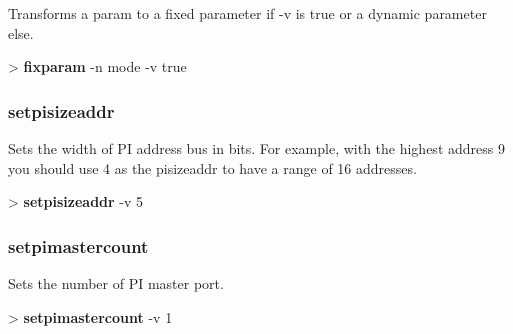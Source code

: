 \documentclass[10pt,a4paper]{article}
\begin{document}
Transforms a param to a fixed parameter  if -v is true or a dynamic parameter else.

\begin{sampletitle}
> \textbf{\tool{} fixparam} -n mode -v true \\
\end{sampletitle}

\subsubsection{setpisizeaddr}
\label{subsec:setpisizeaddr}

Sets the width of PI address bus in bits. For example, with the highest address 9 you should use 4 as the pisizeaddr to have a range of 16 addresses.\\


\begin{sampletitle}
> \textbf{\tool{} setpisizeaddr} -v 5 \\
\end{sampletitle}

\subsubsection{setpimastercount}
\label{subsec:setpimastercount}

Sets the number of PI master port.\\


\begin{sampletitle}
> \textbf{\tool{} setpimastercount} -v 1 \\
\end{sampletitle}
\end{document}
